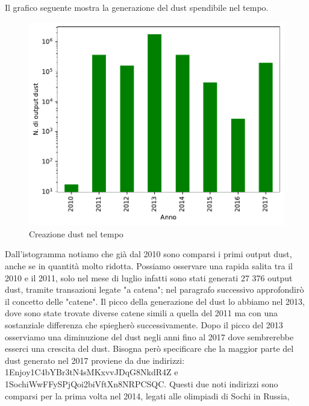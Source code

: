 Il grafico seguente mostra la generazione del dust spendibile nel tempo.
\begin{figure}[h!]
    \centering
    \includegraphics[scale=0.9]{Grafici/dust_created_year.pdf}
    \caption{Creazione dust nel tempo}
    \label{fig:dust_distribuzione}
\end{figure}
\FloatBarrier 
Dall'istogramma notiamo che già dal 2010 sono comparsi i primi output dust, anche se in quantità molto ridotta. Possiamo osservare una rapida salita tra il 2010 e il 2011, solo nel mese di luglio infatti sono stati generati 27 376 output dust, tramite transazioni legate "a catena"; nel paragrafo successivo approfondirò il concetto delle "catene". 
Il picco della generazione del dust lo abbiamo nel 2013, dove sono state trovate diverse catene simili a quella del 2011 ma con una sostanziale differenza che spiegherò successivamente. Dopo il picco del 2013 osserviamo una diminuzione del dust negli anni fino al 2017 dove sembrerebbe esserci una crescita del dust. Bisogna però specificare che la maggior parte del dust generato nel 2017 proviene da due indirizzi: 1Enjoy1C4bYBr3tN4sMKxvvJDqG8NkdR4Z e 1SochiWwFFySPjQoi2biVftXn8NRPCSQC. Questi due noti indirizzi sono comparsi per la prima volta nel 2014, legati alle olimpiadi di Sochi in Russia, 
